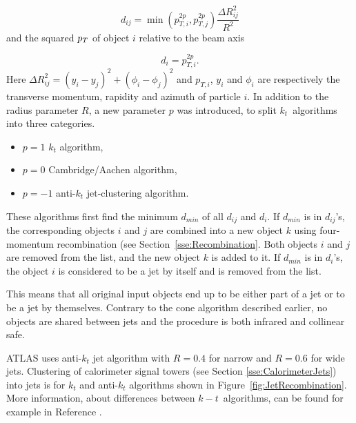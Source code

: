\begin{equation}
	d_{ij} = \min{\left( p_{T,i}^{2p} , p_{T,j}^{2p} \right)} \frac{\Delta R_{ij}^2}{R^2}
\end{equation}
and the squared $p_{T}$ of object $i$ relative to the beam axis

\begin{equation}
	d_i = p_{T,i}^{2p}.
\end{equation}
Here $\Delta R_{ij}^2 = (y_i - y_j)^2 + (\phi_i - \phi_j)^2$ and $p_{T,i}$,
$y_i$ and $\phi_i$ are respectively the transverse momentum, rapidity and
azimuth of particle $i$. In addition to the radius parameter $R$, a new
parameter $p$ was introduced, to split $k_t$~algorithms into three categories.  
\begin{itemize}
	\item $p = 1$ $k_t$ algorithm,
	\item $p = 0$ Cambridge/Aachen algorithm,
	\item $p = -1$ anti-$k_t$ jet-clustering algorithm.
\end{itemize}

These algorithms first find the minimum $d_{min}$ of all $d_{ij}$ and $d_i$. If
$d_{min}$ is in $d_{ij}$'s, the corresponding objects $i$ and $j$ are combined
into a new object $k$ using four-momentum recombination (see
Section~\ref{sse:Recombination}. Both objects $i$ and
$j$ are removed from the list, and the new object $k$ is added to it. If
$d_{min}$ is in $d_i$'s, the object $i$ is considered to be a jet by itself and
is removed from the list.

This means that all original input objects end up to be either part of a jet or
to be a jet by themselves. Contrary to the cone algorithm described earlier, no
objects are shared between jets and the procedure is both infrared and collinear
safe.

ATLAS uses anti-$k_t$ jet algorithm with $R=0.4$ for narrow and $R=0.6$ for wide
jets.  Clustering of calorimeter signal towers (see Section
\ref{sse:CalorimeterJets}) into jets is for $k_t$ and anti-$k_t$ algorithms shown
in Figure~\ref{fig:JetRecombination}.  More information, about differences
between $k-t$~algorithms, can be found for example in Reference \cite{ANTIKT}.

